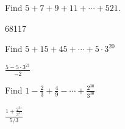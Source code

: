 \begin{questions}

	\begin{answer}
	\end{answer}
	
	
	



\question Find $5 + 7 + 9 + 11+ \cdots + 521$.

	\begin{answer}
		68117
	\end{answer}
	
	
	


\question Find $5 + 15 + 45 + \cdots + 5\cdot 3^{20}$

	\begin{answer}
		$\frac{5-5\cdot 3^{21}}{-2}$
	\end{answer}
	
	
	


\question Find $1 - \frac{2}{3} + \frac{4}{9} - \cdots + \frac{2^{30}}{3^{30}}$

	\begin{answer}
		$\frac{1 + \frac{2^{31}}{3^{31}}}{5/3}$
	\end{answer}
	
	
	



\end{questions}

